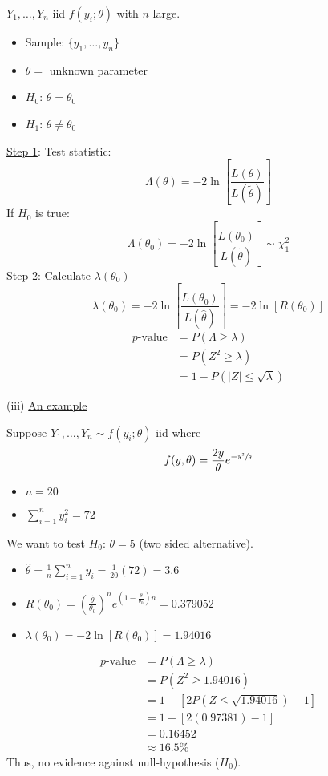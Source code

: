 $ Y_1,\ldots ,Y_n $ iid $ f(y_i;\theta) $ with $ n $ large.
\begin{itemize}
    \item Sample: $ \{y_1,\ldots ,y_n\} $
    \item $ \theta= $ unknown parameter
    \item $ H_0 $: $ \theta=\theta_0 $
    \item $ H_1 $: $ \theta\neq\theta_0 $
\end{itemize}
\underline{Step 1}: Test statistic:
\[ \Lambda(\theta)=-2\ln\left[ \frac{L(\theta)}{L(\tilde{\theta})}  \right] \]
If $ H_0 $ is true:
\[ \Lambda(\theta_0)=-2\ln\left[ \frac{L(\theta_0)}{L(\tilde{\theta})}  \right]
    \sim \chi^2_{1} \]
\underline{Step 2}: Calculate $ \lambda(\theta_0) $
\[ \lambda(\theta_0)=-2\ln\left[ \frac{L(\theta_0)}{L(\hat{\theta})}  \right]=-2\ln
    \left[ R(\theta_0) \right] \]
\begin{align*}
    p\text{-value}
     & =P(\Lambda\geqslant \lambda)      \\
     & =P(Z^2\geqslant \lambda)          \\
     & =1-P(|Z|\leqslant \sqrt{\lambda})
\end{align*}

(iii) \underline{An example}

\begin{Example}{}{}
    Suppose $ Y_1,\ldots ,Y_n \sim f(y_i;\theta) $ iid where
    \[ f(y,\theta)=\frac{2y}{\theta}e^{-\sfrac{y^2}{\theta}} \]
    \begin{itemize}
        \item $ n=20 $
        \item $ \sum\limits_{i=1}^{n} y_i^2=72 $
    \end{itemize}

    We want to test $ H_0 $: $ \theta=5 $ (two sided alternative).
    \begin{itemize}
        \item $ \hat{\theta}=\frac{1}{n} \sum\limits_{i=1}^{n}y_i=\frac{1}{20}(72)=3.6 $
        \item $ R(\theta_0)=\left( \frac{\hat{\theta}}{\theta_0} \right)^n
                  e^{\left(1-\frac{\hat{\theta}}{\theta_0}\right)n} = 0.379052 $
        \item $ \lambda(\theta_0) =-2\ln \left[ R(\theta_0) \right]=1.94016 $
    \end{itemize}
    \begin{align*}
        p\text{-value}
         & =P(\Lambda\geqslant \lambda)                       \\
         & =P(Z^2\geqslant 1.94016)                           \\
         & =1-\left[ 2 P(Z\leqslant \sqrt{1.94016})-1 \right] \\
         & = 1-\left[ 2(0.97381)-1 \right]                    \\
         & = 0.16452                                          \\
         & \approx 16.5\%
    \end{align*}
    Thus, no evidence against null-hypothesis ($ H_0 $).
\end{Example}


